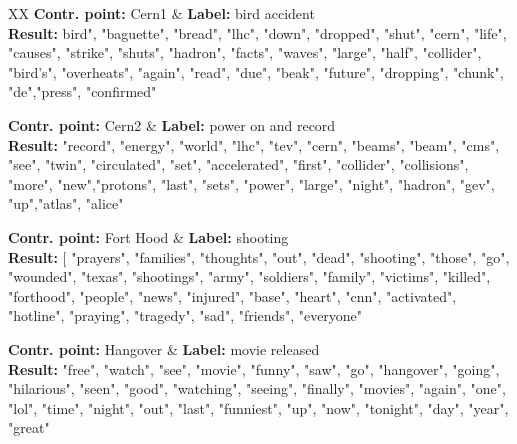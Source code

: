 
\begin{table*}[htbp]
	\centering
	\begin{tabularx}{\textwidth}{XX}
\hline
\textbf{Contr. point:} Cern1 & \textbf{Label:} bird accident\\
	{\textbf{Result:} bird", "baguette", "bread", "lhc", "down", "dropped", "shut", "cern", "life", "causes", "strike", "shuts", "hadron", "facts", "waves", "large", "half", "collider", "bird's", "overheats", "again", "read", "due", "beak", "future", "dropping", "chunk", "de","press", "confirmed"}
 \\
\hline


\textbf{Contr. point:} Cern2 & \textbf{Label:} power on and record \\
{\textbf{Result:}  "record", "energy", "world", "lhc", "tev", "cern", "beams", "beam", "cms", "see", "twin", "circulated", "set", "accelerated", "first", "collider", "collisions", "more", "new","protons", "last", "sets", "power", "large", "night", "hadron", "gev", "up","atlas", "alice"} \\
\hline

\textbf{Contr. point:} Fort Hood & \textbf{Label:} shooting \\
{\textbf{Result:} [ "prayers", "families", "thoughts", "out", "dead", "shooting", "those", "go", "wounded", "texas", "shootings", "army", "soldiers",                "family", "victims", "killed", "forthood", "people", "news", "injured", "base", "heart", "cnn", "activated", "hotline", "praying", "tragedy", "sad", "friends", "everyone"
} \\
\hline


\textbf{Contr. point:} Hangover & \textbf{Label:} movie released \\
{\textbf{Result:} "free", "watch", "see", "movie", "funny", "saw", "go", "hangover",  "going", "hilarious", "seen", "good", "watching", "seeing", "finally", "movies", "again", "one", "lol", "time", "night", "out", "last", "funniest", "up", "now", "tonight", "day", "year", "great"
} \\
\hline





\end{tabularx}
\end{table*}
